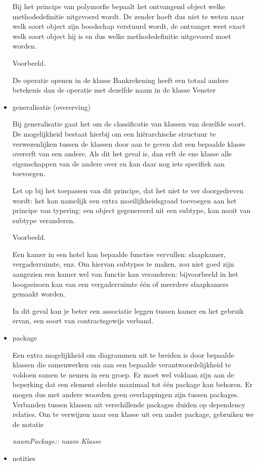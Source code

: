 \begin{itemize}
Bij het principe van polymorfie bepaalt het ontvangend object welke methodedefinitie uitgevoerd wordt. De zender hoeft dus niet te weten naar welk soort object zijn boodschap verstuurd wordt, de ontvanger weet exact welk soort object hij is en dus welke methodedefinitie uitgevoerd moet worden.

Voorbeeld. 

De operatie openen in de klasse Bankrekening heeft een totaal andere betekenis dan de operatie met dezelfde naam in de klasse Venster
\newpage
    \item generalisatie (overerving)
    
Bij generalisatie gaat het om de classificatie van klassen van dezelfde soort. De mogelijkheid bestaat hierbij om een hiërarchische structuur te verwezenlijken tussen de klassen door aan te geven dat een bepaalde klasse overerft van een andere. Als dit het geval is, dan erft de ene klasse alle eigenschappen van de andere over en kan daar nog iets specifiek aan toevoegen.

Let op bij het toepassen van dit principe, dat het niet te ver doorgedreven wordt: het kan namelijk een extra moeilijkheidsgraad toevoegen aan het principe van typering: een object gegenereerd uit een subtype, kan nooit van subtype veranderen.

Voorbeeld. 

Een kamer in een hotel kan bepaalde functies vervullen: slaapkamer, vergaderruimte, enz. Om hiervan subtypes te maken, zou niet goed zijn aangezien een kamer wel van functie kan veranderen: bijvoorbeeld in het hoogseizoen kan van een vergaderruimte één of meerdere slaapkamers gemaakt worden.

In dit geval kan je beter een associatie leggen tussen kamer en het gebruik ervan, een soort van contractsgewijs verband.
    \item package
    
Een extra mogelijkheid om diagrammen uit te breiden is door bepaalde klassen die samenwerken om aan een bepaalde verantwoordelijkheid te voldoen samen te nemen in een groep. Er moet wel voldaan zijn aan de beperking dat een element slechts maximaal tot één package kan behoren. Er mogen dus met andere woorden geen overlappingen zijn tussen packages.
Verbanden tussen klassen uit verschillende packages duiden op dependency relaties. Om te verwijzen naar een klasse uit een ander package, gebruiken we de notatie

\begin{center} \textit{naamPackage:: naam Klasse} \end{center}
      \item notities
      

\end{itemize}
